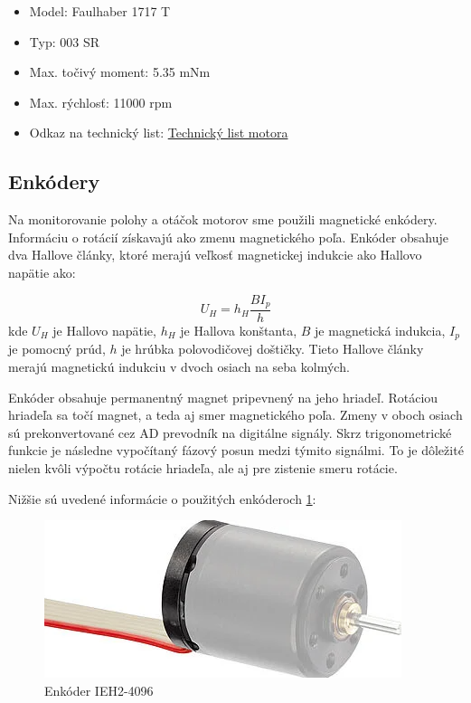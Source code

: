 \begin{itemize}
  \item Model: Faulhaber 1717 T 
  \item Typ: 003 SR
  \item Max. točivý moment: 5.35 mNm
  \item Max. rýchlosť: 11000 rpm
  \item Odkaz na technický list: \href{https://www.faulhaber.com/fileadmin/Import/Media/EN_1717_SR_DFF.pdf}{Technický list motora}
\end{itemize}

\subsection{Enkódery}\label{encoder_section}
Na monitorovanie polohy a otáčok motorov sme použili magnetické enkódery. Informáciu o rotácií získavajú ako zmenu magnetického poľa. Enkóder obsahuje dva Hallove články, ktoré merajú veľkosť magnetickej indukcie ako Hallovo napätie ako: 



\begin{equation}
\label{enc_eq}
U_H = h_H \frac{BI_p}{h}
\end{equation}
kde $U_H$ je Hallovo napätie, $h_H$ je Hallova konštanta, $B$ je magnetická indukcia, $I_p$ je pomocný prúd, $h$ je hrúbka polovodičovej doštičky. Tieto Hallove články merajú magnetickú indukciu v dvoch osiach na seba kolmých.



Enkóder obsahuje permanentný magnet pripevnený na jeho hriadeľ. Rotáciou hriadeľa sa točí magnet, a teda aj smer magnetického poľa. Zmeny v oboch osiach sú prekonvertované cez AD prevodník na digitálne signály. Skrz trigonometrické funkcie je následne vypočítaný fázový posun medzi týmito signálmi. To je dôležité nielen kvôli výpočtu rotácie hriadeľa, ale aj pre zistenie smeru rotácie.

Nižšie sú uvedené informácie o použitých enkóderoch \ref{fig:encoder}:

\begin{figure}[!htbp]
        \centering
        \includegraphics[scale=0.8]{includes/images/encoder.png}
        \caption{Enkóder IEH2-4096}
        \label{fig:encoder}
\end{figure}

